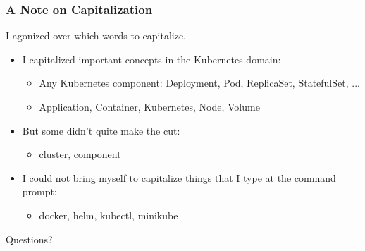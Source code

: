     \begin{frame}
        \frametitle{A Note on Capitalization}
        I agonized over which words to capitalize.
        \begin{itemize}
            \item{I capitalized important concepts in the Kubernetes domain:}
            \begin{itemize}
                \item{Any Kubernetes component: Deployment, Pod, ReplicaSet, StatefulSet, ...}
                \item{Application, Container, Kubernetes, Node, Volume}
            \end{itemize}

            \item{But some didn't quite make the cut:}
            \begin{itemize}
                \item{cluster, component}
            \end{itemize}

            \item{I could not bring myself to capitalize things that I type at the command prompt:}
            \begin{itemize}
                \item{docker, helm, kubectl, minikube}
            \end{itemize}
        \end{itemize}
    \end{frame}

    \begin{frame}
        \begin{center}
            \Huge Questions?
        \end{center}
    \end{frame}


